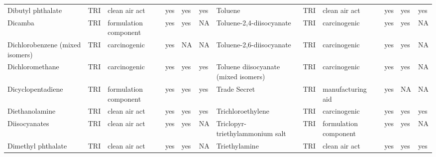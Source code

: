 \begin{table}[H]
{\begin{tabular}{llllllllllll}
            Dibutyl phthalate                                                          & TRI            & clean air act         & yes    & yes     & yes  & Toluene                                                                                                            & TRI            & clean air act         & yes    & yes & yes\\
            Dicamba                                                                    & TRI            & formulation component & yes    & yes     & NA   & Toluene-2,4-diisocyanate                                                                                           & TRI            & carcinogenic & yes & yes & NA\\
            Dichlorobenzene (mixed isomers)                                            & TRI            & carcinogenic          & yes    & NA      & NA   & Toluene-2,6-diisocyanate & TRI & carcinogenic & yes & yes & NA\\
            Dichloromethane                                                            & TRI            & carcinogenic          & yes    & yes     & yes  & Toluene diisocyanate (mixed isomers) & TRI & carcinogenic & yes & yes & NA\\
            Dicyclopentadiene                                                          & TRI            & formulation component & yes    & yes     & yes  & Trade Secret                                                                                                       & TRI            & manufacturing aid & yes & NA & NA\\
            Diethanolamine                                                             & TRI            & clean air act         & yes    & yes     & yes  & Trichloroethylene                                                                                                  & TRI            & carcinogenic          & yes & yes & yes\\
            Diisocyanates                                                              & TRI            & clean air act         & yes    & yes     & NA   & Triclopyr-triethylammonium salt                                                                                    & TRI            & formulation component & yes & yes & NA\\
            Dimethyl phthalate                                                         & TRI            & clean air act         & yes    & yes     & NA   & Triethylamine                                                                                                      & TRI            & clean air act         & yes & yes & yes\\

\end{tabular}}
\end{table}
